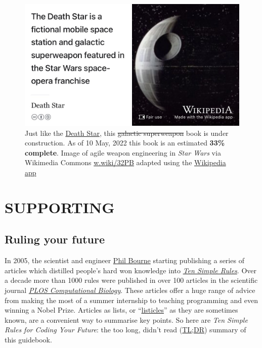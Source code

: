 \documentclass[
]{book}
\begin{document}
\begin{figure}

{\centering \includegraphics[width=0.99\linewidth]{images/DeathStar2} 

}

\caption{Just like the \href{https://en.wikipedia.org/wiki/Death_Star}{Death Star}, this \sout{galactic superweapon} book is under construction. As of 10 May, 2022 this book is an estimated \textbf{33\% complete}. Image of agile weapon engineering in \emph{Star Wars} via Wikimedia Commons \href{https://w.wiki/32PB}{w.wiki/32PB} adapted using the \href{https://apps.apple.com/gb/app/wikipedia/id324715238}{Wikipedia app}}\label{fig:deathstar9-fig}
\end{figure}

\hypertarget{part-supporting}{%
\part{SUPPORTING}\label{part-supporting}}

\hypertarget{ruling}{%
\chapter{Ruling your future}\label{ruling}}

In 2005, the scientist and engineer \href{https://en.wikipedia.org/wiki/Philip_Bourne}{Phil Bourne} starting publishing a series of articles which distilled people's hard won knowledge into \emph{\href{https://collections.plos.org/ten-simple-rules}{Ten Simple Rules}}. \citep{Bourne2005} Over a decade more than 1000 rules were published in over 100 articles in the scientific journal \emph{\href{https://en.wikipedia.org/wiki/PLOS_Computational_Biology}{PLOS Computational Biology}}. \citep{Bourne2018} These articles offer a huge range of advice from making the most of a summer internship \citep{Aicher2017} to teaching programming \citep{tensimplebrown} and even winning a Nobel Prize. \citep{Roberts2015} Articles as lists, or ``\href{https://en.wikipedia.org/wiki/Listicle}{listicles}'' as they are sometimes known, are a convenient way to summarise key points. So here are \emph{Ten Simple Rules for Coding Your Future}: the too long, didn't read (\href{https://en.wiktionary.org/wiki/too_long;_didn\%27t_read}{TL;DR}) summary of this guidebook.
\end{document}

